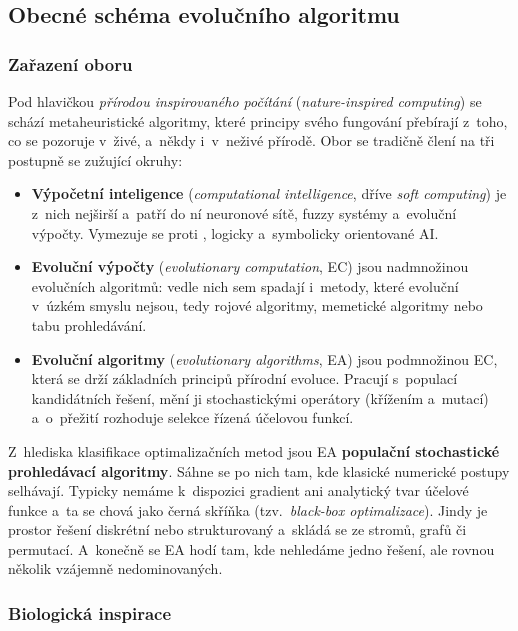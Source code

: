 \documentclass[11pt,a4paper]{article}
\theoremstyle{definition}
\begin{document}
\subsection{Obecné schéma evolučního algoritmu}
\label{ssec:obecne}
\subsubsection{Zařazení oboru}

Pod hlavičkou \emph{přírodou inspirovaného počítání} (\emph{nature-inspired computing}) se
schází metaheuristické algoritmy, které principy svého fungování přebírají z~toho, co se
pozoruje v~živé, a~někdy i~v~neživé přírodě. Obor se tradičně člení na tři postupně se
zužující okruhy:

\begin{itemize}
\item \textbf{Výpočetní inteligence} (\emph{computational intelligence}, dříve
  \emph{soft computing}) je z~nich nejširší a~patří do ní neuronové sítě, fuzzy
  systémy a~evoluční výpočty. Vymezuje se proti , logicky a~symbolicky
  orientované AI.
\item \textbf{Evoluční výpočty} (\emph{evolutionary computation}, EC) jsou
  nadmnožinou evolučních algoritmů: vedle nich sem spadají i~metody, které
  evoluční v~úzkém smyslu nejsou, tedy rojové algoritmy, memetické algoritmy nebo
  tabu prohledávání.
\item \textbf{Evoluční algoritmy} (\emph{evolutionary algorithms}, EA) jsou
  podmnožinou EC, která se drží základních principů přírodní evoluce. Pracují
  s~populací kandidátních řešení, mění ji stochastickými operátory (křížením
  a~mutací) a~o~přežití rozhoduje selekce řízená účelovou funkcí.
\end{itemize}

Z~hlediska klasifikace optimalizačních metod jsou EA \textbf{populační stochastické
prohledávací algoritmy}. Sáhne se po nich tam, kde klasické numerické postupy selhávají.
Typicky nemáme k~dispozici gradient ani analytický tvar účelové funkce a~ta se chová jako
černá skříňka (tzv.\ \emph{black-box optimalizace}). Jindy je prostor řešení diskrétní nebo
strukturovaný a~skládá se ze stromů, grafů či permutací. A~konečně se EA hodí tam, kde
nehledáme jedno řešení, ale rovnou několik vzájemně nedominovaných.

\subsubsection{Biologická inspirace}
\end{document}
